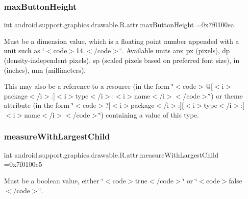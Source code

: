 \subsubsection{\texorpdfstring{max\+Button\+Height}{maxButtonHeight}}
{\footnotesize\ttfamily int android.\+support.\+graphics.\+drawable.\+R.\+attr.\+max\+Button\+Height =0x7f0100ea\hspace{0.3cm}{\ttfamily [static]}}

Must be a dimension value, which is a floating point number appended with a unit such as \char`\"{}$<$code$>$14.\+5sp$<$/code$>$\char`\"{}. Available units are\+: px (pixels), dp (density-\/independent pixels), sp (scaled pixels based on preferred font size), in (inches), mm (millimeters). 

This may also be a reference to a resource (in the form \char`\"{}$<$code$>$@\mbox{[}$<$i$>$package$<$/i$>$\+:\mbox{]}$<$i$>$type$<$/i$>$\+:$<$i$>$name$<$/i$>$$<$/code$>$\char`\"{}) or theme attribute (in the form \char`\"{}$<$code$>$?\mbox{[}$<$i$>$package$<$/i$>$\+:\mbox{]}\mbox{[}$<$i$>$type$<$/i$>$\+:\mbox{]}$<$i$>$name$<$/i$>$$<$/code$>$\char`\"{}) containing a value of this type. \mbox{\label{classandroid_1_1support_1_1graphics_1_1drawable_1_1R_1_1attr_a12fba192144aac4750d57eb28a0904cb}} 
\subsubsection{\texorpdfstring{measure\+With\+Largest\+Child}{measureWithLargestChild}}
{\footnotesize\ttfamily int android.\+support.\+graphics.\+drawable.\+R.\+attr.\+measure\+With\+Largest\+Child =0x7f0100c5\hspace{0.3cm}{\ttfamily [static]}}

Must be a boolean value, either \char`\"{}$<$code$>$true$<$/code$>$\char`\"{} or \char`\"{}$<$code$>$false$<$/code$>$\char`\"{}. 

